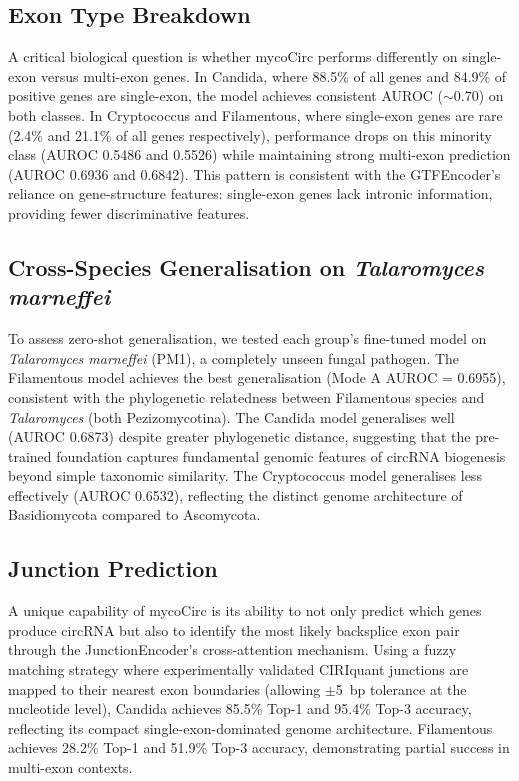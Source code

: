\documentclass[12pt]{article}
\begin{document}
\subsection{Exon Type Breakdown}

A critical biological question is whether mycoCirc performs differently on single-exon versus multi-exon genes. In Candida, where 88.5\% of all genes and 84.9\% of positive genes are single-exon, the model achieves consistent AUROC ($\sim$0.70) on both classes. In Cryptococcus and Filamentous, where single-exon genes are rare (2.4\% and 21.1\% of all genes respectively), performance drops on this minority class (AUROC 0.5486 and 0.5526) while maintaining strong multi-exon prediction (AUROC 0.6936 and 0.6842). This pattern is consistent with the GTFEncoder's reliance on gene-structure features: single-exon genes lack intronic information, providing fewer discriminative features.

\subsection{Cross-Species Generalisation on \textit{Talaromyces marneffei}}

To assess zero-shot generalisation, we tested each group's fine-tuned model on \textit{Talaromyces marneffei} (PM1), a completely unseen fungal pathogen. The Filamentous model achieves the best generalisation (Mode A AUROC = 0.6955), consistent with the phylogenetic relatedness between Filamentous species and \textit{Talaromyces} (both Pezizomycotina). The Candida model generalises well (AUROC 0.6873) despite greater phylogenetic distance, suggesting that the pre-trained foundation captures fundamental genomic features of circRNA biogenesis beyond simple taxonomic similarity. The Cryptococcus model generalises less effectively (AUROC 0.6532), reflecting the distinct genome architecture of Basidiomycota compared to Ascomycota.

\subsection{Junction Prediction}

A unique capability of mycoCirc is its ability to not only predict which genes produce circRNA but also to identify the most likely backsplice exon pair through the JunctionEncoder's cross-attention mechanism. Using a fuzzy matching strategy where experimentally validated CIRIquant junctions are mapped to their nearest exon boundaries (allowing $\pm$5~bp tolerance at the nucleotide level), Candida achieves 85.5\% Top-1 and 95.4\% Top-3 accuracy, reflecting its compact single-exon-dominated genome architecture. Filamentous achieves 28.2\% Top-1 and 51.9\% Top-3 accuracy, demonstrating partial success in multi-exon contexts.
\end{document}
